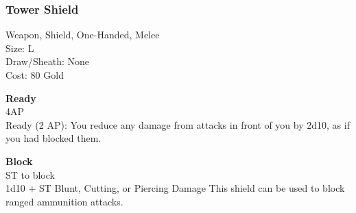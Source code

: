 \subsubsection{Tower Shield}\label{weapon:towerShield}
Weapon, Shield, One-Handed, Melee\\
Size: L\\
Draw/Sheath: None\\
Cost: 80 Gold

\textbf{Ready}\\
4AP\\
Ready (2 AP): You reduce any damage from attacks in front of you by 2d10, as if you had blocked them.

\textbf{Block}\\
ST to block\\
1d10 + \texttimes ST Blunt, Cutting, or Piercing Damage
This shield can be used to block ranged ammunition attacks.\\
